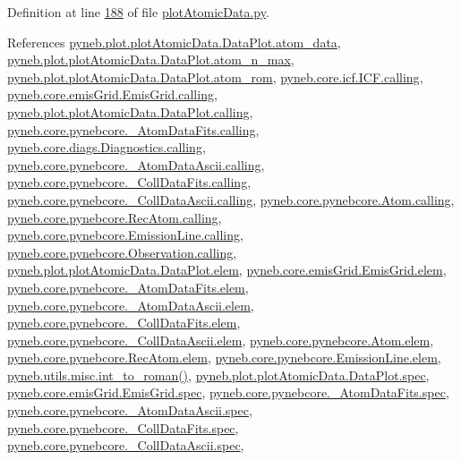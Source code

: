 Definition at line \hyperlink{plot_atomic_data_8py_source_l00188}{188} of file \hyperlink{plot_atomic_data_8py_source}{plot\+Atomic\+Data.\+py}.



References \hyperlink{plot_atomic_data_8py_source_l00071}{pyneb.\+plot.\+plot\+Atomic\+Data.\+Data\+Plot.\+atom\+\_\+data}, \hyperlink{plot_atomic_data_8py_source_l00105}{pyneb.\+plot.\+plot\+Atomic\+Data.\+Data\+Plot.\+atom\+\_\+n\+\_\+max}, \hyperlink{plot_atomic_data_8py_source_l00102}{pyneb.\+plot.\+plot\+Atomic\+Data.\+Data\+Plot.\+atom\+\_\+rom}, \hyperlink{icf_8py_source_l00016}{pyneb.\+core.\+icf.\+I\+C\+F.\+calling}, \hyperlink{emis_grid_8py_source_l00041}{pyneb.\+core.\+emis\+Grid.\+Emis\+Grid.\+calling}, \hyperlink{plot_atomic_data_8py_source_l00042}{pyneb.\+plot.\+plot\+Atomic\+Data.\+Data\+Plot.\+calling}, \hyperlink{pynebcore_8py_source_l00090}{pyneb.\+core.\+pynebcore.\+\_\+\+Atom\+Data\+Fits.\+calling}, \hyperlink{diags_8py_source_l00169}{pyneb.\+core.\+diags.\+Diagnostics.\+calling}, \hyperlink{pynebcore_8py_source_l00311}{pyneb.\+core.\+pynebcore.\+\_\+\+Atom\+Data\+Ascii.\+calling}, \hyperlink{pynebcore_8py_source_l00568}{pyneb.\+core.\+pynebcore.\+\_\+\+Coll\+Data\+Fits.\+calling}, \hyperlink{pynebcore_8py_source_l00918}{pyneb.\+core.\+pynebcore.\+\_\+\+Coll\+Data\+Ascii.\+calling}, \hyperlink{pynebcore_8py_source_l01175}{pyneb.\+core.\+pynebcore.\+Atom.\+calling}, \hyperlink{pynebcore_8py_source_l02572}{pyneb.\+core.\+pynebcore.\+Rec\+Atom.\+calling}, \hyperlink{pynebcore_8py_source_l03263}{pyneb.\+core.\+pynebcore.\+Emission\+Line.\+calling}, \hyperlink{pynebcore_8py_source_l03419}{pyneb.\+core.\+pynebcore.\+Observation.\+calling}, \hyperlink{plot_atomic_data_8py_source_l00045}{pyneb.\+plot.\+plot\+Atomic\+Data.\+Data\+Plot.\+elem}, \hyperlink{emis_grid_8py_source_l00045}{pyneb.\+core.\+emis\+Grid.\+Emis\+Grid.\+elem}, \hyperlink{pynebcore_8py_source_l00083}{pyneb.\+core.\+pynebcore.\+\_\+\+Atom\+Data\+Fits.\+elem}, \hyperlink{pynebcore_8py_source_l00304}{pyneb.\+core.\+pynebcore.\+\_\+\+Atom\+Data\+Ascii.\+elem}, \hyperlink{pynebcore_8py_source_l00560}{pyneb.\+core.\+pynebcore.\+\_\+\+Coll\+Data\+Fits.\+elem}, \hyperlink{pynebcore_8py_source_l00910}{pyneb.\+core.\+pynebcore.\+\_\+\+Coll\+Data\+Ascii.\+elem}, \hyperlink{pynebcore_8py_source_l01165}{pyneb.\+core.\+pynebcore.\+Atom.\+elem}, \hyperlink{pynebcore_8py_source_l02565}{pyneb.\+core.\+pynebcore.\+Rec\+Atom.\+elem}, \hyperlink{pynebcore_8py_source_l03267}{pyneb.\+core.\+pynebcore.\+Emission\+Line.\+elem}, \hyperlink{misc_8py_source_l00013}{pyneb.\+utils.\+misc.\+int\+\_\+to\+\_\+roman()}, \hyperlink{plot_atomic_data_8py_source_l00046}{pyneb.\+plot.\+plot\+Atomic\+Data.\+Data\+Plot.\+spec}, \hyperlink{emis_grid_8py_source_l00046}{pyneb.\+core.\+emis\+Grid.\+Emis\+Grid.\+spec}, \hyperlink{pynebcore_8py_source_l00084}{pyneb.\+core.\+pynebcore.\+\_\+\+Atom\+Data\+Fits.\+spec}, \hyperlink{pynebcore_8py_source_l00305}{pyneb.\+core.\+pynebcore.\+\_\+\+Atom\+Data\+Ascii.\+spec}, \hyperlink{pynebcore_8py_source_l00561}{pyneb.\+core.\+pynebcore.\+\_\+\+Coll\+Data\+Fits.\+spec}, \hyperlink{pynebcore_8py_source_l00911}{pyneb.\+core.\+pynebcore.\+\_\+\+Coll\+Data\+Ascii.\+spec}, 